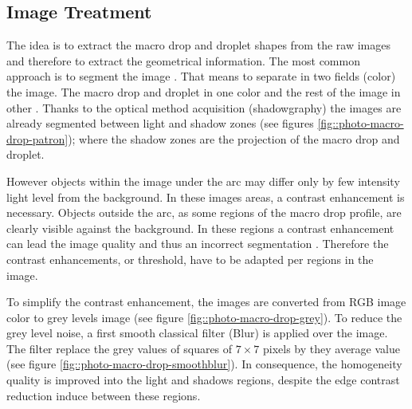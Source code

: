 \documentclass[12pt]{iopart}
\begin{document}
  
\subsection{ Image Treatment}
\label{image_treatment}

The idea is to extract the macro drop and droplet shapes 
from the raw images and therefore to extract the geometrical information.
 The most common approach is to segment the image \cite{WANG}. 
That means to separate in two fields (color) the image. The macro drop and droplet in one color and
the rest of the image in other \cite{COCQUEREZ}. Thanks to the optical method acquisition
 (shadowgraphy) the images are already segmented between
light and shadow zones (see figures \ref{fig::photo-macro-drop-patron});
 where the shadow zones are the projection of the macro drop and droplet.

However objects within the image under the arc may differ only by few intensity light level
from the background. In these images areas, a contrast enhancement is necessary. 
Objects outside the arc, as  some regions of the macro drop profile,
 are clearly visible against the background. In these regions a contrast enhancement 
can lead the image quality and thus an incorrect segmentation \cite{NORDBRUCH}.
 Therefore the contrast enhancements, or threshold, have to be adapted per regions in the image.  

To simplify the contrast enhancement, the images are converted from RGB image color 
to grey levels image (see figure \ref{fig::photo-macro-drop-grey}). To 
reduce the grey level noise, a first smooth classical filter 
(Blur) is applied over the image. The filter replace
the grey values of squares of $7\times 7$ 
pixels by they average value (see figure \ref{fig::photo-macro-drop-smoothblur}). 
In consequence, the homogeneity quality is improved into the light and 
shadows regions, despite the edge contrast reduction induce between these regions. 
\end{document}
